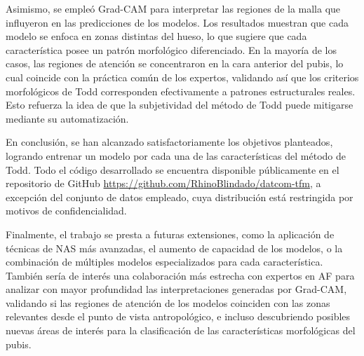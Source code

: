 Asimismo, se empleó Grad-CAM para interpretar las regiones de la malla que influyeron en las predicciones de los modelos. Los resultados muestran que cada modelo se enfoca en zonas distintas del hueso, lo que sugiere que cada característica posee un patrón morfológico diferenciado. En la mayoría de los casos, las regiones de atención se concentraron en la cara anterior del pubis, lo cual coincide con la práctica común de los expertos, validando así que los criterios morfológicos de Todd corresponden efectivamente a patrones estructurales reales. Esto refuerza la idea de que la subjetividad del método de Todd puede mitigarse mediante su automatización.

En conclusión, se han alcanzado satisfactoriamente los objetivos planteados, logrando entrenar un modelo por cada una de las características del método de Todd. Todo el código desarrollado se encuentra disponible públicamente en el repositorio de GitHub \url{https://github.com/RhinoBlindado/datcom-tfm}, a excepción del conjunto de datos empleado, cuya distribución está restringida por motivos de confidencialidad.

Finalmente, el trabajo se presta a futuras extensiones, como la aplicación de técnicas de NAS más avanzadas, el aumento de capacidad de los modelos, o la combinación de múltiples modelos especializados para cada característica. También sería de interés una colaboración más estrecha con expertos en AF para analizar con mayor profundidad las interpretaciones generadas por Grad-CAM, validando si las regiones de atención de los modelos coinciden con las zonas relevantes desde el punto de vista antropológico, e incluso descubriendo posibles nuevas áreas de interés para la clasificación de las características morfológicas del pubis.